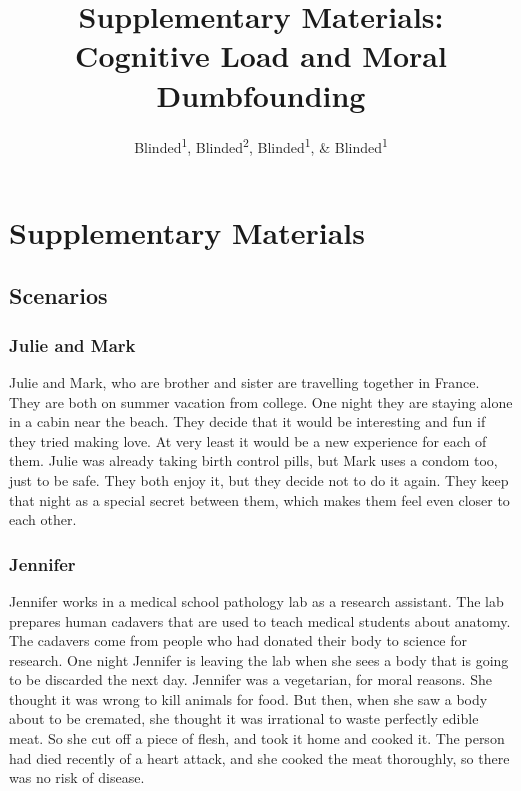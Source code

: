 \documentclass[
  american,
  man,floatsintext]{apa7}
\title{Supplementary Materials: Cognitive Load and Moral Dumbfounding}
\author{Blinded\textsuperscript{1}, Blinded\textsuperscript{2}, Blinded\textsuperscript{1}, \& Blinded\textsuperscript{1}}
\date{}
\affiliation{\vspace{0.5cm}\textsuperscript{1} Blinded\\\textsuperscript{2} Blinded}
\begin{document}
\maketitle

\hypertarget{supplementary-materials}{%
\section{Supplementary Materials}\label{supplementary-materials}}

\hypertarget{scenarios}{%
\subsection{Scenarios}\label{scenarios}}

\hypertarget{julie-and-mark}{%
\subsubsection{Julie and Mark}\label{julie-and-mark}}

Julie and Mark, who are brother and sister are travelling together in France. They are both on summer vacation from college. One night they are staying alone in a cabin near the beach. They decide that it would be interesting and fun if they tried making love. At very least it would be a new experience for each of them. Julie was already taking birth control pills, but Mark uses a condom too, just to be safe. They both enjoy it, but they decide not to do it again. They keep that night as a special secret between them, which makes them feel even closer to each other.

\hypertarget{jennifer}{%
\subsubsection{Jennifer}\label{jennifer}}

Jennifer works in a medical school pathology lab as a research assistant. The lab prepares human cadavers that are used to teach medical students about anatomy. The cadavers come from people who had donated their body to science for research. One night Jennifer is leaving the lab when she sees a body that is going to be discarded the next day. Jennifer was a vegetarian, for moral reasons. She thought it was wrong to kill animals for food. But then, when she saw a body about to be cremated, she thought it was irrational to waste perfectly edible meat. So she cut off a piece of flesh, and took it home and cooked it. The person had died recently of a heart attack, and she cooked the meat thoroughly, so there was no risk of disease.
\end{document}
